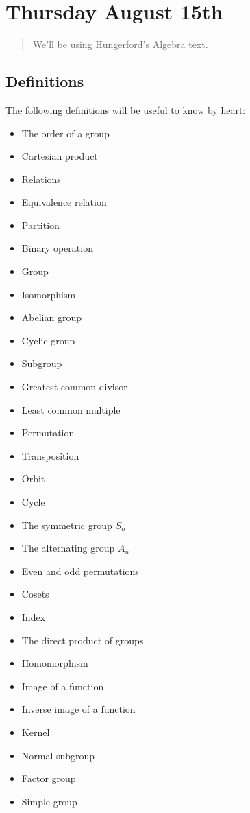 \hypertarget{thursday-august-15th}{%
\section{Thursday August 15th}\label{thursday-august-15th}}

\begin{quote}
We'll be using Hungerford's Algebra text.
\end{quote}

\hypertarget{definitions}{%
\subsection{Definitions}\label{definitions}}

The following definitions will be useful to know by heart:

\begin{itemize}
\tightlist
\item
  The order of a group
\item
  Cartesian product
\item
  Relations
\item
  Equivalence relation
\item
  Partition
\item
  Binary operation
\item
  Group
\item
  Isomorphism
\item
  Abelian group
\item
  Cyclic group
\item
  Subgroup
\item
  Greatest common divisor
\item
  Least common multiple
\item
  Permutation
\item
  Transposition
\item
  Orbit
\item
  Cycle
\item
  The symmetric group \(S_{n}\)
\item
  The alternating group \(A_{n}\)
\item
  Even and odd permutations
\item
  Cosets
\item
  Index
\item
  The direct product of groups
\item
  Homomorphism
\item
  Image of a function
\item
  Inverse image of a function
\item
  Kernel
\item
  Normal subgroup
\item
  Factor group
\item
  Simple group
\end{itemize}

